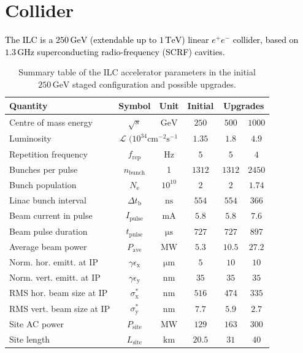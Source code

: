 \documentclass[%
 reprint,
 amsmath,amssymb,
 aps,
]{revtex4-1}
\newcommand{\juan}[1]{\textcolor{black}{{#1}}}
\newcommand{\todo}[1]{\textcolor{black}{{#1}}}
\begin{document}
\section{\label{sec:collider}Collider}




\juan{The ILC is a $250\,{\mathrm{GeV}}$ (extendable up to $1\,{\mathrm{TeV}}$) linear $e^+e^-$ collider, based on $1.3\,{\mathrm{GHz}}$ superconducting radio-frequency (SCRF) cavities.}

\begin{table}
\begin{tabular}{lccccc}
Quantity & Symbol & Unit & Initial &  \multicolumn{2}{c}{Upgrades} \\
\hline
Centre of mass energy & $\sqrt{s}$ & ${\mathrm{GeV}}$ & $250$ & $500$ & $1000$ \\
Luminosity & \multicolumn{2}{c}{${\mathcal{L}}$ $(10^{34}{\mathrm{cm^{-2}s^{-1}}}$})& $1.35$ & $1.8$ & $4.9$ \\
Repetition frequency &$f_{\mathrm{rep}}$ & ${\mathrm{Hz}}$  & $5$ & $5$ & $4$ \\
Bunches per pulse  &$n_{\mathrm{bunch}}$ & 1  & $1312$ & $1312$ & $2450$ \\
Bunch population  &$N_{\mathrm{e}}$ & $10^{10}$ &$2$ & $2$ & $1.74$ \\
Linac bunch interval & $\Delta t_{\mathrm{b}}$ & ${\mathrm{ns}}$ & $554$ & $554$ & $366$ \\
Beam current in pulse & $I_{\mathrm{pulse}}$ & ${\mathrm{mA}}$& $5.8$ & $5.8$ & $7.6$  \\
Beam pulse duration  & $t_{\mathrm{pulse}}$ & ${\mathrm{\mu s}}$ &$727$ & $727$ & $897$ \\
Average beam power  & $P_{\mathrm{ave}}$   & ${\mathrm{MW}}$ & $5.3$   &$10.5$  & $27.2$ \\  
Norm. hor. emitt. at IP & $\gamma\epsilon_{\mathrm{x}}$ & ${\mathrm{\mu m}}$& $5$ & $10$ & $10$  \\ 
Norm. vert. emitt. at IP & $\gamma\epsilon_{\mathrm{y}}$ & ${\mathrm{nm}}$ & $35$ & $35$ & $35$ \\ 
RMS hor. beam size at IP  & $\sigma^*_{\mathrm{x}}$ & ${\mathrm{nm}}$  & $516$ & $474$ & $335$ \\
RMS vert. beam size at IP &$\sigma^*_{\mathrm{y}}$ & ${\mathrm{nm}}$ & $7.7$  & $5.9$ & $2.7$ \\
Site AC power  & $P_{\mathrm{site}}$ &  ${\mathrm{MW}}$ & $129$ & $163$ & $300$ \\
Site length & $L_{\mathrm{site}}$ &  ${\mathrm{km}}$ & $20.5$ & $31$ & $40$ \\
\end{tabular}
\caption{Summary table of the ILC accelerator parameters in the initial $250\,{\mathrm{GeV}}$ staged configuration
and possible upgrades.
\label{tab:ilc-params}}
\end{table}
\end{document}
